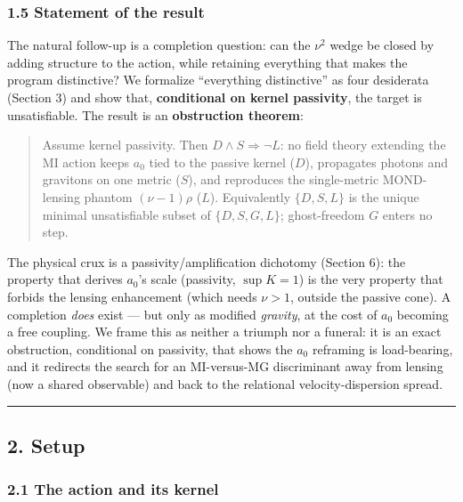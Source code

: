 \documentclass[
]{article}
\begin{document}
\subsubsection{1.5 Statement of the
result}\label{statement-of-the-result}

The natural follow-up is a completion question: can the \(\nu^2\) wedge
be closed by adding structure to the action, while retaining everything
that makes the program distinctive? We formalize ``everything
distinctive'' as four desiderata (Section 3) and show that,
\textbf{conditional on kernel passivity}, the target is unsatisfiable.
The result is an \textbf{obstruction theorem}:

\begin{quote}
Assume kernel passivity. Then \(D\wedge S \Rightarrow \lnot L\): no
field theory extending the MI action keeps \(a_0\) tied to the passive
kernel (\(D\)), propagates photons and gravitons on one metric (\(S\)),
and reproduces the single-metric MOND-lensing phantom \((\nu-1)\rho\)
(\(L\)). Equivalently \(\{D,S,L\}\) is the unique minimal unsatisfiable
subset of \(\{D,S,G,L\}\); ghost-freedom \(G\) enters no step.
\end{quote}

The physical crux is a passivity/amplification dichotomy (Section 6):
the property that derives \(a_0\)'s scale (passivity, \(\sup K=1\)) is
the very property that forbids the lensing enhancement (which needs
\(\nu>1\), outside the passive cone). A completion \emph{does} exist ---
but only as modified \emph{gravity}, at the cost of \(a_0\) becoming a
free coupling. We frame this as neither a triumph nor a funeral: it is
an exact obstruction, conditional on passivity, that shows the \(a_0\)
reframing is load-bearing, and it redirects the search for an
MI-versus-MG discriminant away from lensing (now a shared observable)
and back to the relational velocity-dispersion spread.

\begin{center}\rule{0.5\linewidth}{0.5pt}\end{center}

\subsection{2. Setup}\label{setup}

\subsubsection{2.1 The action and its
kernel}\label{the-action-and-its-kernel}
\end{document}
